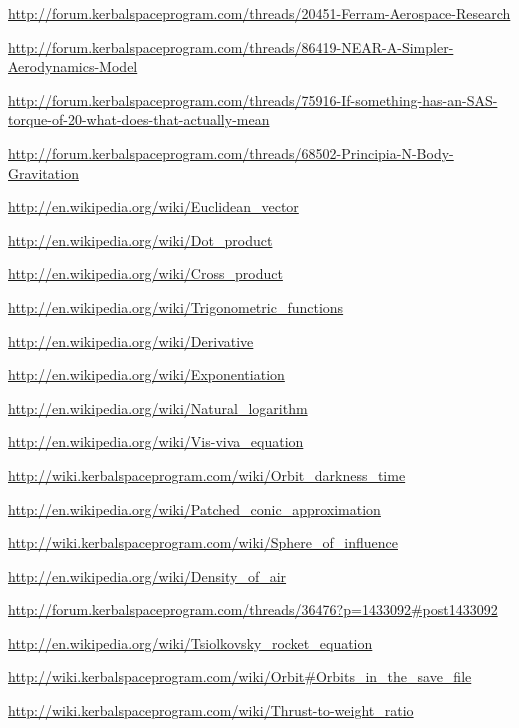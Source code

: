 \documentclass[11pt]{report}
\begin{document}
\begin{thebibliography}{Kerbin}
  \url{http://forum.kerbalspaceprogram.com/threads/20451-Ferram-Aerospace-Research}

  \url{http://forum.kerbalspaceprogram.com/threads/86419-NEAR-A-Simpler-Aerodynamics-Model}

  \url{http://forum.kerbalspaceprogram.com/threads/75916-If-something-has-an-SAS-torque-of-20-what-does-that-actually-mean}

  \url{http://forum.kerbalspaceprogram.com/threads/68502-Principia-N-Body-Gravitation}

  \url{http://en.wikipedia.org/wiki/Euclidean_vector}

  \url{http://en.wikipedia.org/wiki/Dot_product}

  \url{http://en.wikipedia.org/wiki/Cross_product}

  \url{http://en.wikipedia.org/wiki/Trigonometric_functions}

  \url{http://en.wikipedia.org/wiki/Derivative}

  \url{http://en.wikipedia.org/wiki/Exponentiation}

  \url{http://en.wikipedia.org/wiki/Natural_logarithm}

  \url{http://en.wikipedia.org/wiki/Vis-viva_equation}

  \url{http://wiki.kerbalspaceprogram.com/wiki/Orbit_darkness_time}

  \url{http://en.wikipedia.org/wiki/Patched_conic_approximation}

  \url{http://wiki.kerbalspaceprogram.com/wiki/Sphere_of_influence}

  \url{http://en.wikipedia.org/wiki/Density_of_air}

  \url{http://forum.kerbalspaceprogram.com/threads/36476?p=1433092#post1433092}

  \url{http://en.wikipedia.org/wiki/Tsiolkovsky_rocket_equation}

  \url{http://wiki.kerbalspaceprogram.com/wiki/Orbit#Orbits_in_the_save_file}

  \url{http://wiki.kerbalspaceprogram.com/wiki/Thrust-to-weight_ratio}


\end{thebibliography}
\end{document}

